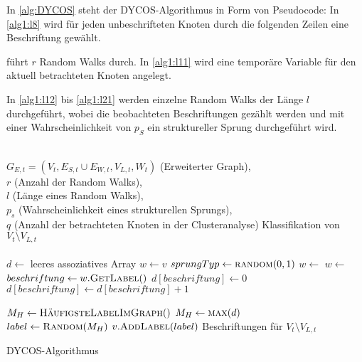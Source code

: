 In \cref{alg:DYCOS} steht der DYCOS-Algorithmus in Form von Pseudocode:
In \cref{alg1:l8} wird für jeden unbeschrifteten Knoten
durch die folgenden Zeilen eine Beschriftung gewählt.

 führt $r$ Random Walks durch. In \cref{alg1:l11} wird eine
temporäre Variable für den aktuell betrachteten Knoten angelegt.

In \cref{alg1:l12} bis \cref{alg1:l21} werden einzelne Random Walks der Länge
$l$ durchgeführt, wobei die beobachteten Beschriftungen gezählt werden und mit
einer Wahrscheinlichkeit von $p_S$ ein struktureller Sprung durchgeführt wird.

\begin{algorithm}[ht]
    \begin{algorithmic}[1]
        \Require \\$G_{E,t} = (V_t, E_{S,t} \cup E_{W,t}, V_{L,t}, W_t)$ (Erweiterter Graph),\\
                 $r$ (Anzahl der Random Walks),\\
                 $l$ (Länge eines Random Walks),\\
                 $p_s$ (Wahrscheinlichkeit eines strukturellen Sprungs),\\
                 $q$ (Anzahl der betrachteten Knoten in der Clusteranalyse)
        \Ensure  Klassifikation von $V_t \setminus V_{L,t}$\\
        \\

        \label{alg1:l8}
            \State $d \gets $ leeres assoziatives Array
            \label{alg1:l10}
                \State $w \gets v$\label{alg1:l11}
                \label{alg1:l12}
                    \State $sprungTyp \gets \Call{random}{0, 1}$
                        \State $w \gets$ 
                    \Else
                        \State $w \gets$ 
                    \EndIf
                    \State $beschriftung \gets w.\Call{GetLabel}{ }$
                        \State $d[beschriftung] \gets 0$
                    \EndIf
                    \State $d[beschriftung] \gets d[beschriftung] + 1$
                \EndFor\label{alg1:l21}
            \EndFor

             
                \State $M_H \gets \Call{HäufigsteLabelImGraph}{ }$
            \Else
                \State $M_H \gets \Call{max}{d}$
            \EndIf
            \\
            \State {}
            \State $label \gets \Call{Random}{M_H}$
            \State $v.\Call{AddLabel}{label}$ 
        \EndFor
        \State \Return Beschriftungen für $V_t \setminus V_{L,t}$
    \end{algorithmic}
\caption{DYCOS-Algorithmus}
\label{alg:DYCOS}
\end{algorithm}

